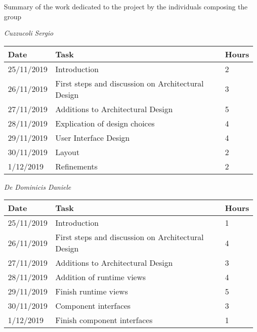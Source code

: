 Summary of the work dedicated to the project by the individuals composing the group

\vspace{1cm}

\textit{Cuzzucoli Sergio}

\hfill

\begin{tabular}{|l|l|l|}

\hline

\textbf{Date} & \textbf{Task} & \textbf{Hours} \\ \hline
25/11/2019 & Introduction &  2 \\ \hline
26/11/2019 & First steps and discussion on Architectural Design & 3 \\ \hline
27/11/2019 & Additions to Architectural Design & 5 \\ \hline
28/11/2019 & Explication of design choices & 4 \\ \hline
29/11/2019 & User Interface Design & 4 \\ \hline
30/11/2019 & Layout & 2 \\ \hline
1/12/2019 & Refinements & 2\\ \hline
\end{tabular}

\vspace{1cm}

\textit{De Dominicis Daniele}

\hfill

\begin{tabular}{|l|l|l|}

\hline

\textbf{Date} & \textbf{Task} & \textbf{Hours} \\ \hline
25/11/2019 & Introduction &  1 \\ \hline
26/11/2019 & First steps and discussion on Architectural Design & 4 \\ \hline
27/11/2019 & Additions to Architectural Design & 3 \\ \hline
28/11/2019 & Addition of runtime views & 4 \\ \hline
29/11/2019 & Finish runtime views & 5 \\ \hline
30/11/2019 & Component interfaces & 3 \\ \hline
1/12/2019 & Finish component interfaces & 1\\ \hline
\end{tabular}